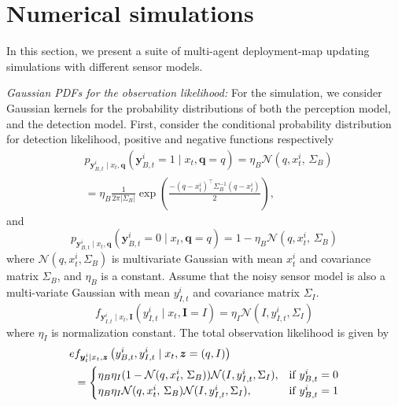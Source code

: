 \documentclass[journal]{IEEEtran}
\begin{document}




\section{Numerical simulations}
\label{sec:sec7}
In this section, we present a suite of multi-agent deployment-map updating simulations with different sensor models.


\textit{Gaussian PDFs for the observation likelihood:}
For the simulation, we consider Gaussian kernels for the probability distributions of both the perception model, and the detection model.
First, consider the conditional probability distribution for detection likelihood, positive and negative functions respectively
\begin{align*}
&p_{
	\bm{y}_{B,t}^i\mid
	x_t,\bm{q}
}(\bm{y}_{B,t}^i=1\mid x_t,\bm{q}=q)
=\eta_{B}\mathcal{N}(q,x_t^i,\,\Sigma_B) \\
& = \eta_{B}\frac{1}{2\pi\left|\Sigma_B\right|}
\exp\left(
\frac{-(q-x_t^i)^{\top}\Sigma_B^{-1}(q-x_t^i)}{2}
\right),
\end{align*}
and 
\[
p_{
	\bm{y}_{B,t}^i\mid
	x_t,\bm{q}
}(\bm{y}_{B,t}^i=0\mid x_t,\bm{q}=q)
=1-\eta_{B}\mathcal{N}(q,x_t^i,\,\Sigma_B)
\]
where $\mathcal{N}(q,x_t^i,\Sigma_B)$ is multivariate Gaussian with mean $x_t^i$ and covariance matrix $\Sigma_B$, and $\eta_{B}$ is a constant.
Assume that the noisy sensor model is also a multi-variate Gaussian with mean $y_{I,t}^i$ and covariance matrix $\Sigma_I$.
\[
f_{
	\bm{y}_{I,t}^i\mid
	x_t,\bm{I}
}(y_{I,t}^i\mid x_t,\bm{I}=I)
=
\eta_I \mathcal{N}(I,y_{I,t}^i,\Sigma_I)
\]
where $\eta_I$ is normalization constant. The total observation likelihood is given by
\begin{align*}e
&f_{\bm{y}_t^i\mid x_t,\bm{z}}
\left(
y_{B,t}^i,y_{I,t}^i \mid x_t,\bm{z}=(q,I)
\right) \\
&=\begin{cases}
\eta_B\eta_I(1-\mathcal{N}(q,x_t^i,\,\Sigma_B))\mathcal{N}(I,y_{I,t}^i,\Sigma_I)
, &\textup{if }y_{B,t}^i = 0 \\
\eta_B\eta_I\mathcal{N}(q,x_t^i,\,\Sigma_B)
\mathcal{N}(I,y_{I,t}^i,\Sigma_I)
, &\textup{if }y_{B,t}^i = 1
\end{cases}
\end{align*}
\end{document}
